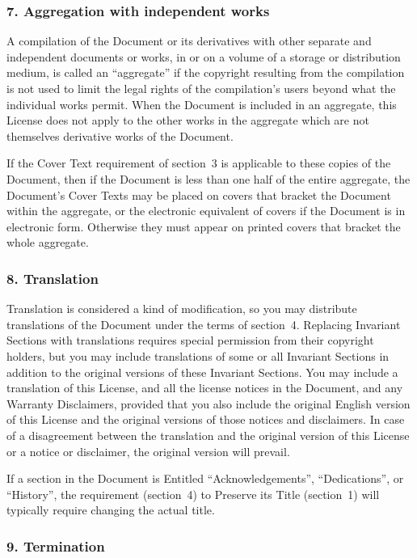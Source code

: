 \documentclass[a4paper,openany]{book}
\begin{document}
\begin{results}
\subsubsection*{7. Aggregation with independent works}

A compilation of the Document or its derivatives with other separate
and independent documents or works, in or on a volume of a storage or
distribution medium, is called an ``aggregate'' if the copyright
resulting from the compilation is not used to limit the legal rights
of the compilation's users beyond what the individual works permit.
When the Document is included in an aggregate, this License does not
apply to the other works in the aggregate which are not themselves
derivative works of the Document.

If the Cover Text requirement of section~3 is applicable to these
copies of the Document, then if the Document is less than one half of
the entire aggregate, the Document's Cover Texts may be placed on
covers that bracket the Document within the aggregate, or the
electronic equivalent of covers if the Document is in electronic form.
Otherwise they must appear on printed covers that bracket the whole
aggregate.

\subsubsection*{8. Translation}

Translation is considered a kind of modification, so you may
distribute translations of the Document under the terms of section~4.
Replacing Invariant Sections with translations requires special
permission from their copyright holders, but you may include
translations of some or all Invariant Sections in addition to the
original versions of these Invariant Sections. You may include a
translation of this License, and all the license notices in the
Document, and any Warranty Disclaimers, provided that you also include
the original English version of this License and the original versions
of those notices and disclaimers. In case of a disagreement between
the translation and the original version of this License or a notice
or disclaimer, the original version will prevail.

If a section in the Document is Entitled ``Acknowledgements'',
``Dedications'', or ``History'', the requirement (section~4) to Preserve
its Title (section~1) will typically require changing the actual
title.

\subsubsection*{9. Termination}


\end{results}
\end{document}
